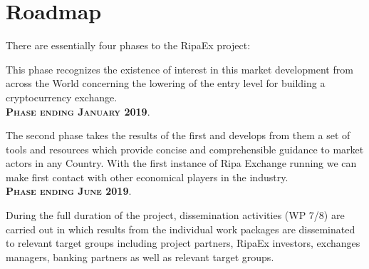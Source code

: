 \documentclass[11pt,fleqn,oneside]{book} %
\begin{document}
\section{Roadmap}
There are essentially four phases to the RipaEx project:
\begin{center}
	\begin{tcolorbox}[roadmapBox,
		title=\textbf{\textsc{Funding the project: XPX PreSale and RIPA TEC (WP2)}}]

		This phase recognizes the existence of interest in this market development
		from across the World concerning the lowering of the entry level for building a cryptocurrency exchange.\\
		\vspace{1cm}
		\centering\textbf{\textsc{Phase ending January 2019}}.
	\end{tcolorbox}
	\resizebox{0.05\textwidth}{26pt}{$\Downarrow$}
	\begin{tcolorbox}[roadmapBox,
		title=\textbf{\textsc{First exchange opening and development of tools and resources (WP3)}}]

		The second phase takes the results of the first 
		and develops from them a set of tools and resources which provide concise and comprehensible guidance to market actors in any
		Country. With the first instance of Ripa Exchange running we can make first contact with other economical players in the industry.\\
		\vspace{1cm}
		\centering\textbf{\textsc{Phase ending June 2019}}.
	\end{tcolorbox}
	\resizebox{0.05\textwidth}{26pt}{$\Downarrow$}
	\begin{tcolorbox}[roadmapBox,
		title=\textbf{\textsc{Dissemination (WP 7/8) and Project Coordination (WP1)}}]

		During the full duration of the project, 
		dissemination activities (WP 7/8) are carried out in which results from the individual work packages are disseminated 
		to relevant target groups including project partners, RipaEx investors, exchanges managers, banking partners as well 
		as relevant target groups.
	\end{tcolorbox}
	\resizebox{0.05\textwidth}{26pt}{$\Downarrow$}
	\begin{tcolorbox}[roadmapBox,
		title=\textbf{\textsc{Development of hybrid-decentralized exchange (WP 4-6)}}]


\end{tcolorbox}
\end{center}
\end{document}
